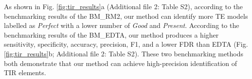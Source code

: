 \documentclass{bmcart}
\begin{document}
As shown in Fig. \ref{fig:tir_results}a (Additional file 2: Table S2), according to the benchmarking results of the BM\_RM2, our method can identify more TE models labelled as \emph{Perfect} with a lower number of \emph{Good} and \emph{Present}. According to the benchmarking results of the BM\_EDTA, our method produces a higher sensitivity, specificity, accuracy, precision, F1, and a lower FDR than EDTA (Fig. \ref{fig:tir_results}b; Additional file 2: Table S2). These two benchmarking methods both demonstrate that our method can achieve high-precision identification of TIR elements.

\end{document}
